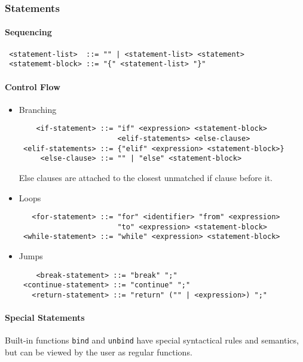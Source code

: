 \subsubsection{Statements}

\paragraph{Sequencing}

\begin{verbatim}
 <statement-list>  ::= "" | <statement-list> <statement>
 <statememt-block> ::= "{" <statement-list> "}"
\end{verbatim}

\paragraph{Control Flow}

\begin{itemize}
\item Branching
\begin{verbatim}
    <if-statement> ::= "if" <expression> <statement-block>
                       <elif-statements> <else-clause>
 <elif-statements> ::= {"elif" <expression> <statement-block>}
     <else-clause> ::= "" | "else" <statement-block>
\end{verbatim}
Else clauses are attached to the closest unmatched if clause before it.

\item Loops
\begin{verbatim}
   <for-statement> ::= "for" <identifier> "from" <expression>
                       "to" <expression> <statement-block>
 <while-statement> ::= "while" <expression> <statement-block>
\end{verbatim}

\item Jumps
\begin{verbatim}
    <break-statement> ::= "break" ";"
 <continue-statement> ::= "continue" ";"
   <return-statement> ::= "return" ("" | <expression>) ";"
\end{verbatim}
\end{itemize}

\paragraph{Special Statements}
Built-in functions \texttt{bind} and \texttt{unbind} have special syntactical rules and semantics,
but can be viewed by the user as regular functions.

